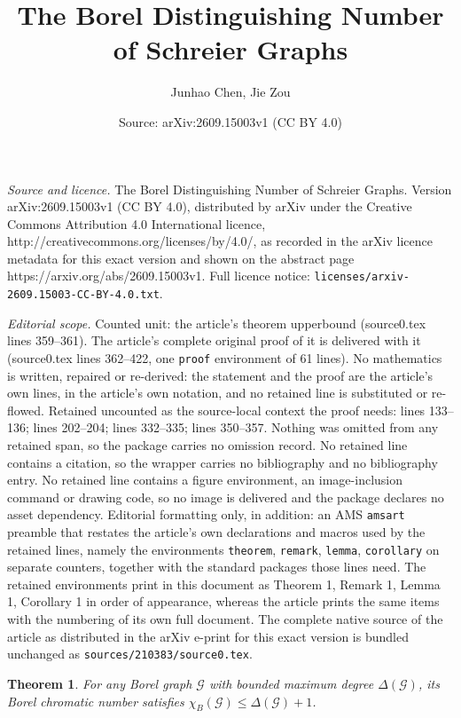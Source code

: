 \documentclass[10pt,a4paper]{amsart}
\title{The Borel Distinguishing Number of Schreier Graphs}
\author{Junhao Chen, Jie Zou}
\date{Source: arXiv:2609.15003v1 (CC BY 4.0)}
\newtheorem{theorem}{Theorem}
\begin{document}
\maketitle

\noindent\emph{Source and licence.} The Borel Distinguishing Number of Schreier Graphs. Version arXiv:2609.15003v1 (CC BY 4.0), distributed by arXiv under the Creative Commons Attribution 4.0 International licence, http://creativecommons.org/licenses/by/4.0/, as recorded in the arXiv licence metadata for this exact version and shown on the abstract page https://arxiv.org/abs/2609.15003v1. Full licence notice: \texttt{licenses/arxiv-2609.15003-CC-BY-4.0.txt}.\par\smallskip

\noindent\textit{Editorial scope.} Counted unit: the article's theorem upperbound (source0.tex lines 359--361). The article's complete original proof of it is delivered with it (source0.tex lines 362--422, one \texttt{proof} environment of 61 lines). No mathematics is written, repaired or re-derived: the statement and the proof are the article's own lines, in the article's own notation, and no retained line is substituted or re-flowed.  Retained uncounted as the source-local context the proof needs: lines 133--136; lines 202--204; lines 332--335; lines 350--357.  Nothing was omitted from any retained span, so the package carries no omission record.  No retained line contains a citation, so the wrapper carries no bibliography and no bibliography entry.  No retained line contains a figure environment, an image-inclusion command or drawing code, so no image is delivered and the package declares no asset dependency.  Editorial formatting only, in addition: an AMS \texttt{amsart} preamble that restates the article's own declarations and macros used by the retained lines, namely the environments \texttt{theorem}, \texttt{remark}, \texttt{lemma}, \texttt{corollary} on separate counters, together with the standard packages those lines need.  The retained environments print in this document as Theorem 1, Remark 1, Lemma 1, Corollary 1 in order of appearance, whereas the article prints the same items with the numbering of its own full document.  The complete native source of the article as distributed in the arXiv e-print for this exact version is bundled unchanged as \texttt{sources/210383/source0.tex}.
\begin{theorem}
\label{KST}
For any Borel graph $\mathcal{G}$ with bounded maximum degree $\Delta(\mathcal{G})$, its Borel chromatic number satisfies $\chi_B(\mathcal{G})\le \Delta(\mathcal{G}) + 1$.    
\end{theorem}
\end{document}
